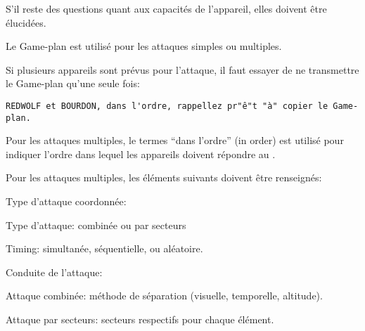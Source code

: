 \begin{e1}
	\item S'il reste des questions quant aux capacités de l'appareil, elles doivent être élucidées.
	
	\begin{minipage}{\linewidth}
		\item Le Game-plan est utilisé pour les attaques simples ou multiples.
		
		Si plusieurs appareils sont prévus pour l'attaque, il faut essayer de ne transmettre le Game-plan qu'une seule fois:
		\begin{lstlisting}[caption=AO Update: code, label=aoupdatecode]
	REDWOLF et BOURDON, dans l'ordre, rappellez pr"ê"t "à" copier le Game-plan.
		\end{lstlisting}
	\end{minipage}
	
	\item Pour les attaques multiples, le termes ``dans l'ordre'' (in order) est utilisé pour indiquer l'ordre dans lequel les appareils doivent répondre au \ja{}.
	
	Pour les attaques multiples, les éléments suivants doivent être renseignés:
	
	\begin{e2}
		
		\item Type d'attaque coordonnée:
		
		\begin{e3}
			
			\item Type d'attaque: combinée ou par secteurs
			
			\item Timing: simultanée, séquentielle, ou aléatoire.
			
		\end{e3}
		
		\item Conduite de l'attaque:
		
		\begin{e3}
			
			\item Attaque combinée: méthode de séparation (visuelle, temporelle, altitude).
			
			\begin{minipage}{\linewidth}
				
				\item Attaque par secteurs: secteurs respectifs pour chaque élément.
				

\end{minipage}
\end{e3}
\end{e2}
\end{e1}
